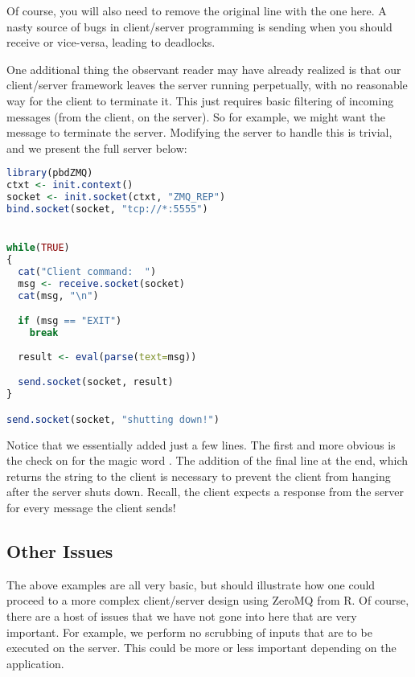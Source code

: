 Of course, you will also need to remove the original  line
with the one here.  A nasty source of bugs in client/server programming is
sending when you should receive or vice-versa, leading to deadlocks.

One additional thing the observant reader may have already realized is that our
client/server framework leaves the server running perpetually, with no
reasonable way for the client to terminate it.  This just requires basic
filtering of incoming messages (from the client, on the server).  So for
example, we might want the message  to terminate the server.
Modifying the server to handle this is trivial, and we present the full server
below:

\begin{lstlisting}[language=R,title=Full Server]
library(pbdZMQ)
ctxt <- init.context()
socket <- init.socket(ctxt, "ZMQ_REP")
bind.socket(socket, "tcp://*:5555")


while(TRUE)
{
  cat("Client command:  ")
  msg <- receive.socket(socket)
  cat(msg, "\n")

  if (msg == "EXIT")
    break
  
  result <- eval(parse(text=msg))

  send.socket(socket, result)
}

send.socket(socket, "shutting down!")
\end{lstlisting}

Notice that we essentially added just a few lines.  The first and more obvious
is the check on  for the magic word .  The addition
of the final  line at the end, which returns the string
 to the client is necessary to prevent the client from
hanging after the server shuts down.  Recall, the client expects a response
from the server for every message the client sends!



\subsection{Other Issues}

The above examples are all very basic, but should illustrate how one could
proceed to a more complex client/server design using ZeroMQ from R.  Of course,
there are a host of issues that we have not gone into here that are very 
important.  For example, we perform no scrubbing of inputs that are to be 
executed on the server.  This could be more or less important depending on the
application.  

